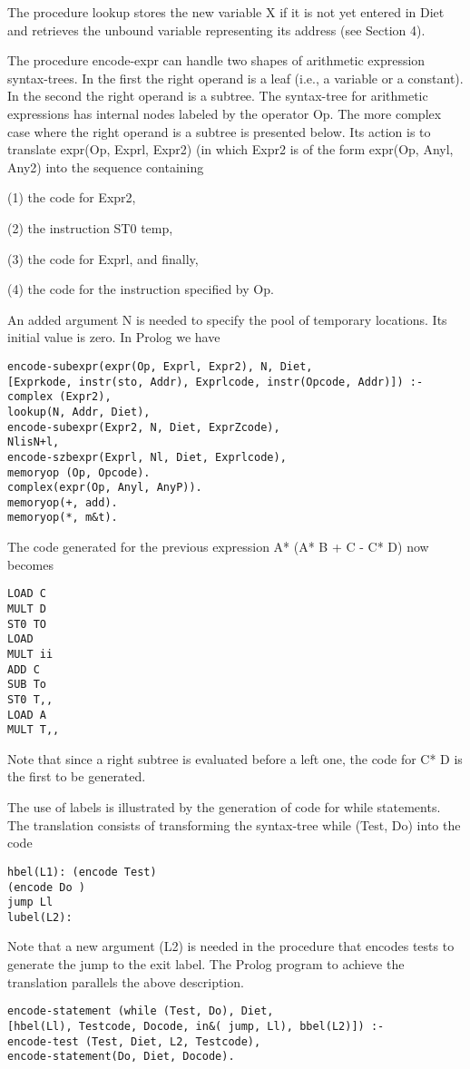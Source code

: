 The procedure lookup stores the new variable X if it is not yet entered in Diet
and retrieves the unbound variable representing its address (see Section 4). 

The procedure encode-expr can handle two shapes of arithmetic expression
syntax-trees. In the first the right operand is a leaf (i.e., a variable or a constant).
In the second the right operand is a subtree. The syntax-tree for arithmetic
expressions has internal nodes labeled by the operator Op. The more complex
case where the right operand is a subtree is presented below. Its action is to
translate expr(Op, Exprl, Expr2) (in which Expr2 is of the form expr(Op, Anyl,
Any2) into the sequence containing

(1) the code for Expr2,

(2) the instruction ST0 temp,

(3) the code for Exprl, and finally,

(4) the code for the instruction specified by Op. 

An added argument N is needed to specify the pool of temporary locations. Its
initial value is zero. In Prolog we have
\begin{verbatim}
encode-subexpr(expr(Op, Exprl, Expr2), N, Diet,
[Exprkode, instr(sto, Addr), Exprlcode, instr(Opcode, Addr)]) :-
complex (Expr2),
lookup(N, Addr, Diet),
encode-subexpr(Expr2, N, Diet, ExprZcode),
NlisN+l,
encode-szbexpr(Exprl, Nl, Diet, Exprlcode),
memoryop (Op, Opcode).
complex(expr(Op, Anyl, AnyP)).
memoryop(+, add).
memoryop(*, m&t).
\end{verbatim}

The code generated for the previous expression A* (A* B + C - C* D) now
becomes
\begin{verbatim}
LOAD C
MULT D
ST0 TO
LOAD
MULT ii
ADD C
SUB To
ST0 T,,
LOAD A
MULT T,, 
\end{verbatim}
Note that since a right subtree is evaluated before a left one, the code for C* D
is the first to be generated. 

The use of labels is illustrated by the generation of code for while statements.
The translation consists of transforming the syntax-tree while (Test, Do) into the
code
\begin{verbatim}
hbel(L1): (encode Test)
(encode Do )
jump Ll
lubel(L2): 
\end{verbatim}

Note that a new argument (L2) is needed in the procedure that encodes tests
to generate the jump to the exit label. The Prolog program to achieve the
translation parallels the above description.
\begin{verbatim}
encode-statement (while (Test, Do), Diet,
[hbel(Ll), Testcode, Docode, in&( jump, Ll), bbel(L2)]) :-
encode-test (Test, Diet, L2, Testcode),
encode-statement(Do, Diet, Docode). 
\end{verbatim}

